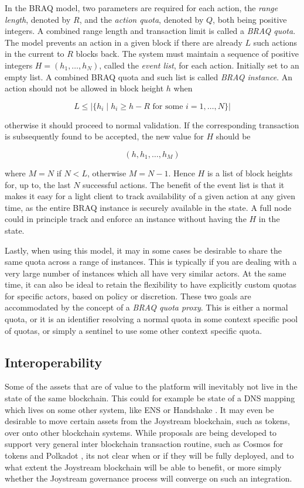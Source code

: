 \documentclass{article}
\begin{document}
In the BRAQ model, two parameters are required for each action, the \textit{range length}, denoted by $R$, and the \textit{action quota}, denoted by $Q$, both being positive integers. A combined range length and transaction limit is called a \textit{BRAQ quota}. The model prevents an action in a given block if there are already $L$ such actions in the current to $R$ blocks back. The system must maintain a sequence of positive integers $H=(h_1, \ldots, h_N)$, called the \textit{event list}, for each action. Initially set to an empty list. A combined BRAQ quota and such list is called \textit{BRAQ instance}.
An action should not be allowed in block height $h$ when

$$ L \leq | \{ h_i \mid h_i \geq h-R\mbox{ for some } i=1,\ldots,N\} |$$ %

otherwise it should proceed to normal validation. If the corresponding transaction is subsequently found to be accepted, the new value for $H$ should be

$$ (h, h_1, \ldots, h_{M}) $$

where $M=N$ if $N < L$, otherwise $M = N - 1$. Hence $H$ is a list of block heights for, up to, the last $N$ successful actions. The benefit of the event list is that it makes it easy for a light client to track availability of a given action at any given time, as the entire BRAQ instance is securely available in the state. A full node could in principle track and enforce an instance without having the $H$ in the state.

Lastly, when using this model, it may in some cases be desirable to share the same quota across a range of instances. This is typically if you are dealing with a very large number of instances which all have very similar actors. At the same time, it can also be ideal to retain the flexibility to have explicitly custom quotas for specific actors, based on policy or discretion. These two goals are accommodated by the concept of a \textit{BRAQ quota proxy}. This is either a normal quota, or it is an identifier resolving a normal quota in some context specific pool of quotas, or simply a sentinel to use some other context specific quota.

\subsection{Interoperability}

Some of the assets that are of value to the platform will inevitably not live in the state of the same blockchain. This could for example be state of a DNS mapping which lives on some other system, like ENS \cite{ens} or Handshake \cite{handshake}. It may even be desirable to move certain  assets from the Joystream blockchain, such as tokens, over onto other blockchain systems. While proposals are being developed to support very general inter blockchain transaction routine, such as Cosmos \cite{cosmos} for tokens and Polkadot \cite{polkadot}, its not clear when or if they will be fully deployed, and to what extent the Joystream blockchain will be able to benefit, or more simply whether the Joystream governance process will converge on such an integration.
\end{document}
